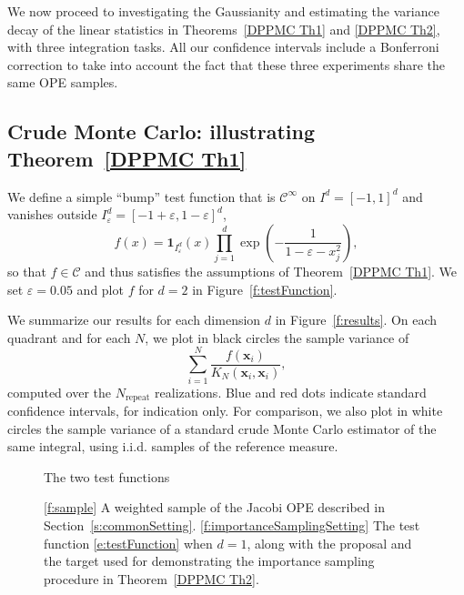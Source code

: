 \documentclass[a4paper,11pt]{article}
\numberwithin{equation}{section}
\theoremstyle{definition}
\newcommand{\rev}[1]{#1}
\newcommand{\eq}{\begin{equation}}
\newcommand{\qe}{\end{equation}}
\newcommand{\bs}{\boldsymbol}
\newcommand{\bv}{\mathbf}
\renewcommand{\epsilon}{\varepsilon}
\def\bx{{\bv x}}
\def\figdir{.}
\def\IND{{\bs 1}}
\begin{document}
We now proceed to investigating the Gaussianity and estimating the variance decay of the linear statistics in Theorems~\ref{DPPMC Th1} and \ref{DPPMC Th2}, with three integration tasks. All our confidence intervals include a Bonferroni correction to take into account the fact that these three experiments share the same OPE samples.

\subsection{Crude Monte Carlo: illustrating Theorem~\ref{DPPMC Th1}}
\label{s:crudeMCExperiment}

We define a simple ``bump'' test function that is $\mathscr C^\infty$ on
$I^d=[-1,1]^d$ and vanishes outside $I_\epsilon^d=[-1+\epsilon,1-\epsilon]^d$,
\eq
f(x) = \IND_{I_\epsilon^d}(x) \prod_{j=1}^d  \exp\left( - \frac{1}{1-\epsilon-x_j^2}  \right),
\label{e:testFunction}
\qe
so that \rev{$f\in\mathscr C$} and thus satisfies the assumptions of Theorem~\ref{DPPMC Th1}. We set $\epsilon=0.05$ and plot $f$ for $d=2$ in Figure~\ref{f:testFunction}.

We summarize our results for each dimension $d$ in Figure~\ref{f:results}. On each quadrant and for each $N$, we plot in black circles the sample variance of $$ \sum_{i=1}^N \frac{f(\bx_i)}{K_N(\bx_i,\bx_i)},$$ computed over the $N_{\text{repeat}}$ realizations. Blue and red dots indicate standard confidence intervals, for indication only. \rev{For comparison, we also plot in white circles the sample variance of a standard crude Monte Carlo estimator of the same integral, using i.i.d. samples of the reference measure.}

\begin{figure}
\caption{The two test functions}
\label{f:testFunctions}
\end{figure}

\begin{figure}
\caption{\ref{f:sample} A weighted sample of the Jacobi OPE described in Section~\ref{s:commonSetting}. \rev{\ref{f:importanceSamplingSetting} The test function \eqref{e:testFunction} when
  $d=1$, along with the proposal and the target used for demonstrating the importance sampling procedure in Theorem~\ref{DPPMC Th2}.}}
\end{figure}
\end{document}
